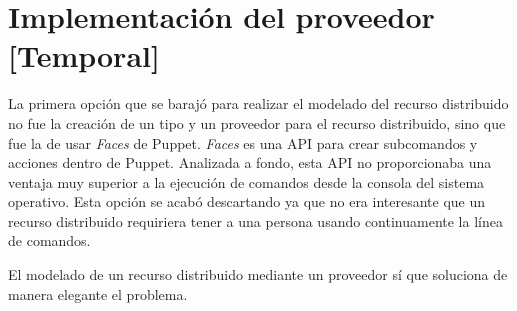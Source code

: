 \section{Implementación del proveedor [Temporal]}

La primera opción que se barajó para realizar el modelado del recurso distribuido no fue la creación de un tipo y un proveedor para el recurso distribuido, sino que fue la de usar \emph{Faces} de Puppet. \emph{Faces} es una API para crear subcomandos y acciones dentro de Puppet. Analizada a fondo, esta API no proporcionaba una ventaja muy superior a la ejecución de comandos desde la consola del sistema operativo. Esta opción se acabó descartando ya que no era interesante que un recurso distribuido requiriera tener a una persona usando continuamente la línea de comandos.

El modelado de un recurso distribuido mediante un proveedor sí que soluciona de manera elegante el problema.


